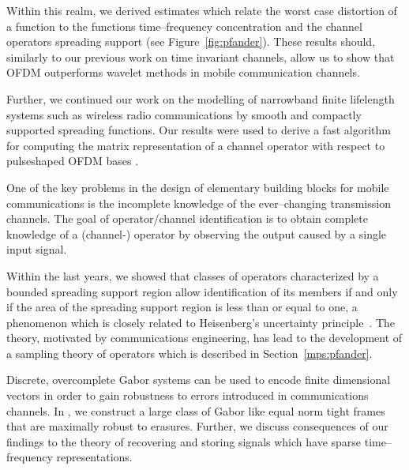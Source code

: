Within this realm, we derived estimates which relate the worst case
distortion of a function to the functions time--frequency
concentration and the channel operators spreading support (see
Figure~\ref{fig:pfander}). These results should, similarly to our
previous work on time invariant channels, allow us to show that OFDM
outperforms wavelet methods in mobile communication channels.

Further,  we continued our work on the modelling of narrowband
finite lifelength systems such as wireless radio communications by
smooth and compactly supported spreading functions. Our results were
used to derive a fast algorithm for computing the matrix
representation of a channel operator with respect to pulseshaped
OFDM bases \cite{GP06}.

  One of the key
problems in the design of elementary building blocks for mobile
communications is the incomplete knowledge of the ever--changing
transmission channels. The goal of operator/channel identification
is to obtain complete knowledge of a (channel-) operator by
observing the output caused by a single input signal.

Within the last years, we showed that classes of operators characterized by a bounded
spreading support region allow identification of its members if and only if the area of
the spreading support region is less than or equal to one, a phenomenon which is closely
related to Heisenberg's uncertainty principle~\cite{PW06,PW06b}. The theory, motivated by
communications engineering, has lead to the development of a sampling theory of operators
which is described in Section~\ref{mps:pfander}.

 Discrete, overcomplete Gabor systems can be
used to encode finite dimensional vectors in order to gain
robustness to errors introduced in  communications channels. In
\cite{KPR06}, we construct a large class of Gabor like equal norm
tight frames that are maximally robust to erasures. Further, we
discuss consequences of our findings to the theory of recovering and
storing signals which have sparse time--frequency representations.


